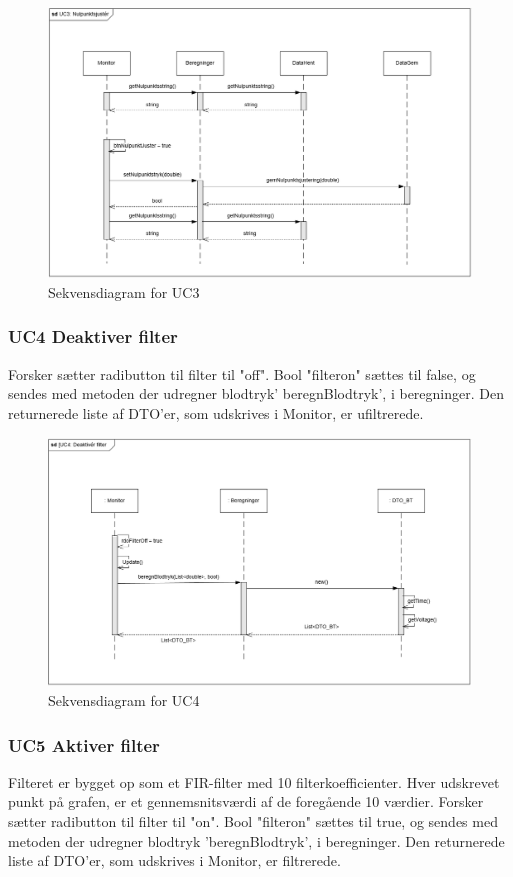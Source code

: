 \begin{figure}[H]
	\centering
	\includegraphics[width=1\textwidth]{Figurer/UC3_SD_SW}
	\caption{Sekvensdiagram for UC3}
\end{figure}

\subsubsection{UC4 Deaktiver filter}
Forsker sætter radibutton til filter til "off".
Bool "filteron" sættes til false, og sendes med metoden der udregner blodtryk' beregnBlodtryk', i beregninger. Den returnerede liste af DTO'er, som udskrives i Monitor, er ufiltrerede.

\begin{figure}[H]
	\centering
	\includegraphics[width=1\textwidth]{Figurer/UC4_SD_SW}
	\caption{Sekvensdiagram for UC4}
\end{figure}

\subsubsection{UC5 Aktiver filter}
Filteret er bygget op som et FIR-filter med 10 filterkoefficienter. Hver udskrevet punkt på grafen, er et gennemsnitsværdi af de foregående 10 værdier.
Forsker sætter radibutton til filter til "on".
Bool "filteron" sættes til true, og sendes med metoden der udregner blodtryk 'beregnBlodtryk', i beregninger. Den returnerede liste af DTO'er, som udskrives i Monitor, er filtrerede.

